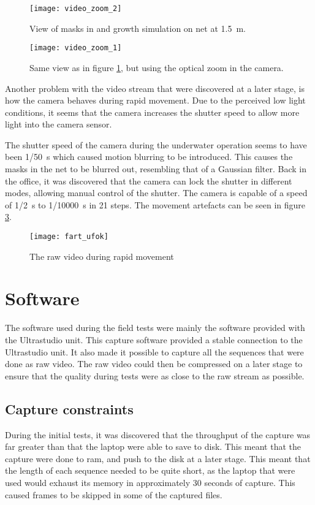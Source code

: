 \begin{figure}[htbp]
	\centering
	\texttt{[image: video\_zoom\_2]}
	\caption{View of masks in and growth simulation on net at \SI{1.5}{\metre}.}
	\label{fig:video_zoom_2}
\end{figure}

\begin{figure}[htbp]
	\centering
	\texttt{[image: video\_zoom\_1]}
	\caption{Same view as in figure \ref{fig:video_zoom_2}, but using the optical zoom in the camera.}
	\label{fig:video_zoom_1}
\end{figure}



Another problem with the video stream that were discovered at a later stage, is how the camera behaves during rapid movement. 
Due to the perceived low light conditions, it seems that the camera increases the shutter speed to allow more 
light into the camera sensor. 

The shutter speed of the camera during the underwater operation seems to 
have been \SI{1/50}{\second} which caused motion blurring to be introduced. This 
causes the masks in the net to be blurred out, resembling that of a 
Gaussian filter. Back in the office, it was discovered that the camera can lock the 
shutter in different modes, allowing manual control of the shutter. The camera 
is capable of a speed of \SI{1/2}{\second} to \SI{1/10000}{\second} in 21 steps. 
The movement artefacts can be seen in figure \ref{fig:fart_ufok}.


\begin{figure}[hbp]
	\centering
	\texttt{[image: fart\_ufok]}
	\caption{The raw video during rapid movement}
	\label{fig:fart_ufok}
\end{figure}


\section{Software}
The software used during the field tests were mainly the software provided with the Ultrastudio unit. This capture software provided a stable connection to 
the Ultrastudio unit. It also made it possible to capture all the sequences that were done as raw video. The raw video could then be compressed on a later 
stage to ensure that the quality during tests were as close to the raw stream as possible.

\subsection{Capture constraints}

During the initial tests, it was discovered that the throughput of the capture was far greater than that the laptop were able 
to save to disk. This meant that the capture were done to ram, and push to the disk at a later stage. This meant that the length of each sequence needed to 
be quite short, as the laptop that were used would exhaust its memory in approximately 30 seconds of capture. This caused frames to 
be skipped in some of the captured files.